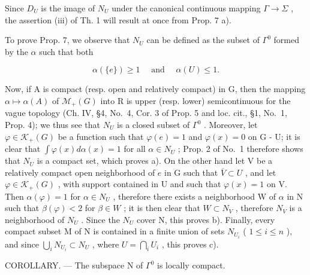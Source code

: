 Since \(D_{U}\) is the image of \(N_{U}\) under the canonical continuous mapping \(\Gamma \rightarrow \Sigma\) , the assertion (iii) of Th. 1 will result at once from Prop. 7 a).

To prove Prop. 7, we observe that \(N_{U}\) can be defined as the subset of \(\Gamma^{0}\) formed by the \(\alpha\) such that both

\[
\alpha (\{e \}) \geqslant 1 \quad \text { and } \quad \alpha (U) \leqslant 1.
\]

Now, if A is compact (resp. open and relatively compact) in G, then the mapping \(\alpha \mapsto \alpha(A)\) of \(\mathcal{M}_{+}(G)\) into R is upper (resp. lower) semicontinuous for the vague topology (Ch. IV, §4, No.~4, Cor. 3 of Prop. 5 and loc. cit., §1, No.~1, Prop. 4); we thus see that \(N_{U}\) is a closed subset of \(\Gamma^{0}\) . Moreover, let \(\varphi \in \mathcal{K}_{+}(G)\) be a function such that \(\varphi(e) = 1\) and \(\varphi(x) = 0\) on G - U; it is clear that \(\int \varphi(x)d\alpha(x) = 1\) for all \(\alpha \in N_{U}\) ; Prop. 2 of No.~1 therefore shows that \(N_{U}\) is a compact set, which proves a). On the other hand let V be a relatively compact open neighborhood of \(e\) in G such that \(\overline{V} \subset U\) , and let \(\varphi \in \mathcal{K}_{+}(G)\) , with support contained in U and such that \(\varphi(x) = 1\) on V. Then \(\alpha(\varphi) = 1\) for \(\alpha \in N_{U}\) , therefore there exists a neighborhood W of \(\alpha\) in N such that \(\beta(\varphi) < 2\) for \(\beta \in W\) ; it is then clear that \(W \subset N_{V}\) , therefore \(N_{V}\) is a neighborhood of \(N_{U}\) . Since the \(N_{U}\) cover N, this proves b). Finally, every compact subset M of N is contained in a finite union of sets \(N_{U_i}\) ( \(1 \leqslant i \leqslant n\) ), and since \(\bigcup_{i} N_{U_i} \subset N_{U}\) , where \(U = \bigcap_{i} U_i\) , this proves c).

COROLLARY. --- The subspace N of \(\Gamma^0\) is locally compact.
